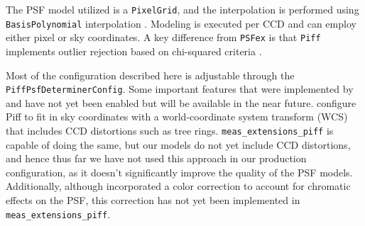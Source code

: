 The PSF model utilized is a \texttt{PixelGrid}, and the interpolation is performed using \texttt{BasisPolynomial} interpolation \citep{2021MNRAS.501.1282J}.
Modeling is executed per CCD and can employ either pixel or sky coordinates.
A key difference from \texttt{PSFex} is that  \texttt{Piff} implements outlier rejection based on chi-squared criteria \citep[see][for more details]{2021MNRAS.501.1282J}.

Most of the configuration described here is adjustable through the \texttt{PiffPsfDeterminerConfig}.
Some important features that were implemented by \citet{2021MNRAS.501.1282J} and \citet{2025OJAp....8E..26S} have not yet been enabled but will be available in the near future.
\citet{2021MNRAS.501.1282J} configure Piff to fit in sky coordinates with a world-coordinate system transform (WCS) that includes CCD distortions such as tree rings.
\texttt{meas\_extensions\_piff} is capable of doing the same, but our models do not yet include CCD distortions, and hence thus far we have not used this approach in our production configuration, as it doesn't significantly improve the quality of the PSF models.
Additionally, although \citet{2025OJAp....8E..26S} incorporated a color correction to account for chromatic effects on the PSF, this correction has not yet been implemented in  \texttt{meas\_extensions\_piff}.
